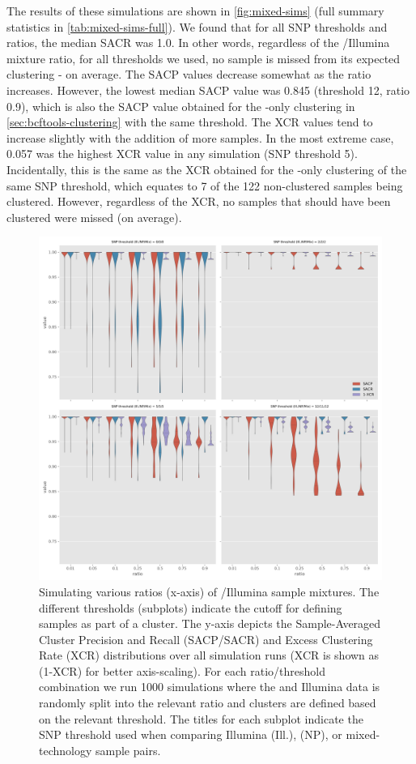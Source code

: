 The results of these simulations are shown in \autoref{fig:mixed-sims} (full summary statistics in \autoref{tab:mixed-sims-full}). We found that for all SNP thresholds and ratios, the median SACR was 1.0. In other words, regardless of the \ont{}/Illumina mixture ratio, for all thresholds we used, no sample is missed from its expected clustering - on average. The SACP values decrease somewhat as the \ont{} ratio increases. However, the lowest median SACP value was 0.845 (threshold 12, ratio 0.9), which is also the SACP value obtained for the \ont{}-only clustering in \autoref{sec:bcftools-clustering} with the same threshold. The XCR values tend to increase slightly with the addition of more \ont{} samples. In the most extreme case, 0.057 was the highest XCR value in any simulation (SNP threshold 5). Incidentally, this is the same as the XCR obtained for the \ont{}-only clustering of the same SNP threshold, which equates to 7 of the 122 non-clustered samples being clustered. However, regardless of the XCR, no samples that should have been clustered were missed (on average).

\begin{figure}
\begin{center}
\includegraphics[width=0.90\columnwidth]{Chapter2/Figs/mixed_simulations.png}
\caption{{Simulating various ratios (x-axis) of \ont{}/Illumina sample mixtures. The different thresholds (subplots) indicate the cutoff for defining samples as part of a cluster. The y-axis depicts the Sample-Averaged Cluster Precision and Recall (SACP/SACR) and Excess Clustering Rate (XCR) distributions over all simulation runs (XCR is shown as (1-XCR) for better axis-scaling). For each ratio/threshold combination we run 1000 simulations where the \ont{} and Illumina data is randomly split into the relevant ratio and clusters are defined based on the relevant threshold. The titles for each subplot indicate the SNP threshold used when comparing Illumina (Ill.), \ont{} (NP), or mixed-technology sample pairs.
{\label{fig:mixed-sims}}%
}}
\end{center}
\end{figure}

